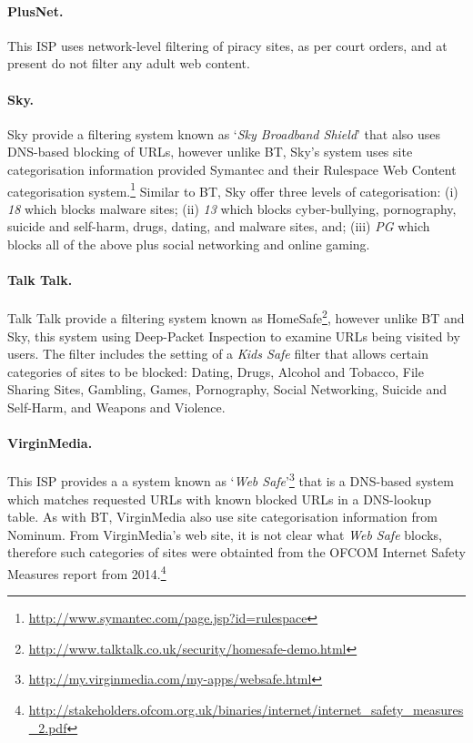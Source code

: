 \documentclass{bmcart}
\begin{document}
\paragraph{PlusNet.}
This ISP uses network-level filtering of piracy sites, as per court orders, and at present do not filter any adult web content.

\paragraph{Sky.}
Sky provide a filtering system known as `\textit{Sky Broadband Shield}' that also uses DNS-based blocking of URLs, however unlike BT, Sky's system uses site categorisation information provided Symantec and their Rulespace Web Content categorisation system.\footnote{\url{http://www.symantec.com/page.jsp?id=rulespace}} 
Similar to BT, Sky offer three levels of categorisation: (i) \textit{18} which blocks malware sites; (ii) \textit{13} which blocks cyber-bullying, pornography, suicide and self-harm, drugs, dating, and malware sites, and; (iii) \textit{PG} which blocks all of the above plus social networking and online gaming.

\paragraph{Talk Talk.}
Talk Talk provide a filtering system known as HomeSafe\footnote{\url{http://www.talktalk.co.uk/security/homesafe-demo.html}}, however unlike BT and Sky, this system using Deep-Packet Inspection to examine URLs being visited by users.
The filter includes the setting of a \textit{Kids Safe} filter that allows certain categories of sites to be blocked: Dating, Drugs, Alcohol and Tobacco, File Sharing Sites, Gambling, Games, Pornography, Social Networking, Suicide and Self-Harm, and Weapons and Violence.

\paragraph{VirginMedia.} 
This ISP provides a a system known as `\textit{Web Safe}'\footnote{\url{http://my.virginmedia.com/my-apps/websafe.html}} that is a DNS-based system which matches requested URLs with known blocked URLs in a DNS-lookup table.
As with BT, VirginMedia also use site categorisation information from Nominum.
From VirginMedia's web site, it is not clear what \textit{Web Safe} blocks, therefore such categories of sites were obtainted from the OFCOM Internet Safety Measures report from 2014.\footnote{\url{http://stakeholders.ofcom.org.uk/binaries/internet/internet_safety_measures_2.pdf}}
\end{document}
